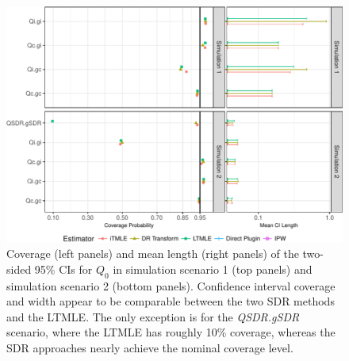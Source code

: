 \documentclass{article}\usepackage[]{graphicx}\usepackage[]{color}
\newenvironment{knitrout}{}{} %
\begin{document}
\begin{knitrout}
\color{fgcolor}\begin{figure}[H]

{\centering \includegraphics[width=.9\linewidth]{figure/plot-simres_all_coverCIlen-1} 

}

\caption{Coverage (left panels) and mean length (right panels) of the two-sided 95\% CIs for $Q_0$ in simulation scenario 1 (top panels) and simulation scenario 2 (bottom panels). Confidence interval coverage and width appear to be comparable between the two SDR methods and the LTMLE. The only exception is for the \textit{QSDR.gSDR} scenario, where the LTMLE has roughly 10\% coverage, whereas the SDR  approaches nearly achieve the nominal coverage level.}\label{fig:simres.all.coverCIlen}
\end{figure}


\end{knitrout}
\end{document}

